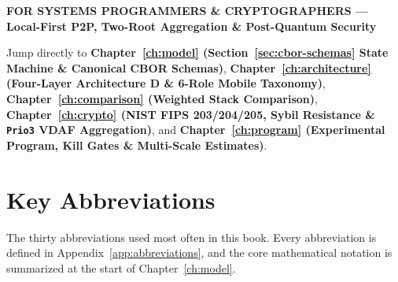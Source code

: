 \documentclass[10pt,twoside,openany]{book}
\theoremstyle{dpepstyle}
\newcommand{\audiencebox}[3]{%
  \par\smallskip\noindent
  \colorbox{SoftBg}{%
    \parbox{\dimexpr\textwidth-2\fboxsep\relax}{%
      \vspace{5pt}
      {\footnotesize\textbf{\textcolor{CrimsonAccent}{\MakeUppercase{#1}} --- \textcolor{NavyPrimary}{#2}}}\par\vspace{3pt}
      {\small #3}
      \vspace{5pt}
    }%
  }\par\smallskip
}
\begin{document}
\vspace{4pt}
\audiencebox{For Systems Programmers \& Cryptographers}{Local-First P2P, Two-Root Aggregation \& Post-Quantum Security}{
Jump directly to \textbf{Chapter~\ref{ch:model} (Section~\ref{sec:cbor-schemas} State Machine \& Canonical CBOR Schemas)}, \textbf{Chapter~\ref{ch:architecture} (Four-Layer Architecture D \& 6-Role Mobile Taxonomy)}, \textbf{Chapter~\ref{ch:comparison} (Weighted Stack Comparison)}, \textbf{Chapter~\ref{ch:crypto} (NIST FIPS 203/204/205, Sybil Resistance \& \texttt{Prio3} VDAF Aggregation)}, and \textbf{Chapter~\ref{ch:program} (Experimental Program, Kill Gates \& Multi-Scale Estimates)}.}
\clearpage

\tableofcontents
\clearpage

\chapter*{Key Abbreviations}

{\small\color{SlateDark} The thirty abbreviations used most often in this book. Every abbreviation is defined in Appendix~\ref{app:abbreviations}, and the core mathematical notation is summarized at the start of Chapter~\ref{ch:model}.}
\end{document}
